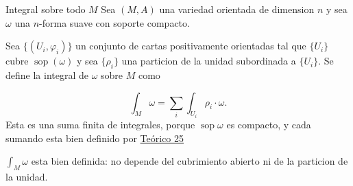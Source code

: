 \begin{bookdefinition}{Integral sobre todo $M$}
Sea $(M,A)$ una variedad orientada de dimension $n$ y sea $\omega$ una $n$-forma suave con soporte compacto.

Sea $\{(U_i,\varphi_i)\}$ un conjunto de cartas positivamente orientadas tal que $\{U_i\}$ cubre $\operatorname{sop}(\omega)$ y sea $\{\rho_i\}$ una particion de la unidad subordinada a $\{U_i\}$. Se define la integral de $\omega$ sobre $M$ como

\[
\int_M\omega=\sum_i\int_{U_i}\rho_i\cdot\omega.
\]
Esta es una suma finita de integrales, porque $\operatorname{sop}\omega$ es compacto, y cada sumando esta bien definido por \hyperref[blk:11f3f1]{Teórico 25}

\end{bookdefinition}
\begin{bookproposition}{}
$\int_M\omega$ esta bien definida: no depende del cubrimiento abierto ni de la particion de la unidad.

\end{bookproposition}
